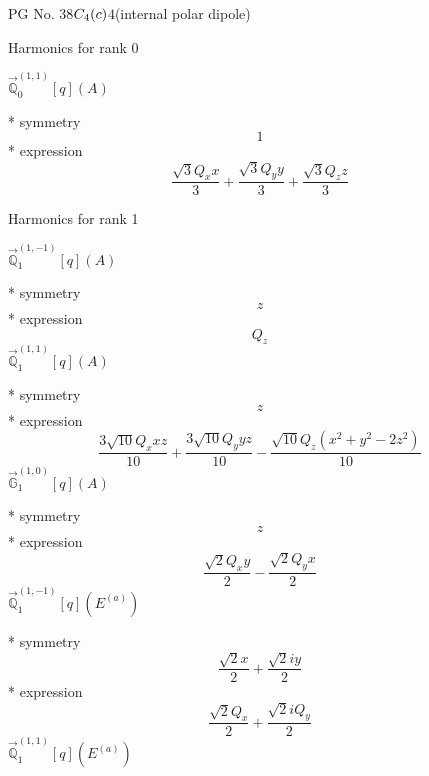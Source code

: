 \documentclass[fleqn,8pt]{jsarticle}
\begin{document}
\setcounter{MaxMatrixCols}{32}

\renewcommand{\tablename}{Table~}
\renewcommand{\figurename}{Figure~}
\begin{center}
\LARGE
PG No. 38\quad$C_{\rm 4}(c)$\quad$4$\quad[ tetragonal ] (internal polar dipole)
\end{center}

\noindent * Harmonics for rank 0

\noindent\quad $\vec{\mathbb{Q}}_{0}^{(1,1)}[q](A)$

\noindent\quad ** symmetry
\begin{dmath*}
1
\end{dmath*}
\noindent\quad ** expression
\begin{dmath*}
\frac{\sqrt{3} Q_{x} x}{3} + \frac{\sqrt{3} Q_{y} y}{3} + \frac{\sqrt{3} Q_{z} z}{3}
\end{dmath*}

\noindent * Harmonics for rank 1

\noindent\quad $\vec{\mathbb{Q}}_{1}^{(1,-1)}[q](A)$

\noindent\quad ** symmetry
\begin{dmath*}
z
\end{dmath*}
\noindent\quad ** expression
\begin{dmath*}
Q_{z}
\end{dmath*}
\noindent\quad $\vec{\mathbb{Q}}_{1}^{(1,1)}[q](A)$

\noindent\quad ** symmetry
\begin{dmath*}
z
\end{dmath*}
\noindent\quad ** expression
\begin{dmath*}
\frac{3 \sqrt{10} Q_{x} x z}{10} + \frac{3 \sqrt{10} Q_{y} y z}{10} - \frac{\sqrt{10} Q_{z} \left(x^{2} + y^{2} - 2 z^{2}\right)}{10}
\end{dmath*}
\noindent\quad $\vec{\mathbb{G}}_{1}^{(1,0)}[q](A)$

\noindent\quad ** symmetry
\begin{dmath*}
z
\end{dmath*}
\noindent\quad ** expression
\begin{dmath*}
\frac{\sqrt{2} Q_{x} y}{2} - \frac{\sqrt{2} Q_{y} x}{2}
\end{dmath*}
\noindent\quad $\vec{\mathbb{Q}}_{1}^{(1,-1)}[q](E^{(a)})$

\noindent\quad ** symmetry
\begin{dmath*}
\frac{\sqrt{2} x}{2} + \frac{\sqrt{2} i y}{2}
\end{dmath*}
\noindent\quad ** expression
\begin{dmath*}
\frac{\sqrt{2} Q_{x}}{2} + \frac{\sqrt{2} i Q_{y}}{2}
\end{dmath*}
\noindent\quad $\vec{\mathbb{Q}}_{1}^{(1,1)}[q](E^{(a)})$
\end{document}

